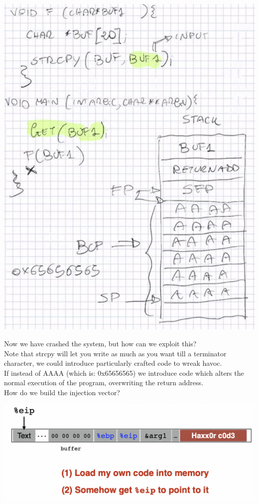 \documentclass[11pt, oneside]{article}   	%
\begin{document}
\begin{center}
\includegraphics[scale = 0.5]{memory2}
\end{center}
Now we have crashed the system, but how can we exploit this?\\ 
Note that strcpy will let you write as much as you want till a terminator character, we could introduce particularly crafted code to wreak havoc.\\
If instead of AAAA (which is: 0x65656565) we introduce code which alters the normal execution of the program, overwriting the return address.\\
How do we build the injection vector?
\begin{center}
\includegraphics[scale = 0.4]{injcode}
\end{center}
\end{document}
